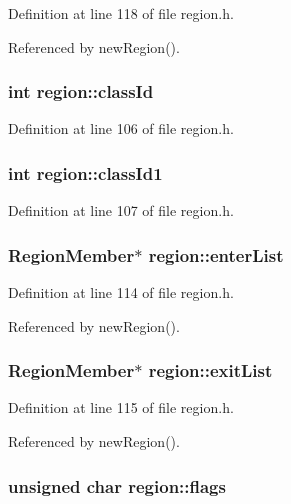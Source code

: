 Definition at line 118 of file region.h.

Referenced by new\-Region().
\subsubsection{\setlength{\rightskip}{0pt plus 5cm}int \bf{region::class\-Id}}\label{structregion_3cc7d5453a5b9b391f7f7270f28cb848}




Definition at line 106 of file region.h.
\subsubsection{\setlength{\rightskip}{0pt plus 5cm}int \bf{region::class\-Id1}}\label{structregion_12dd23f48c7d164bd5e8dcb6c7e80d1c}




Definition at line 107 of file region.h.
\subsubsection{\setlength{\rightskip}{0pt plus 5cm}\bf{Region\-Member}$\ast$ \bf{region::enter\-List}}\label{structregion_9dad214bc7a5636b0327b2a30c7c08d8}




Definition at line 114 of file region.h.

Referenced by new\-Region().
\subsubsection{\setlength{\rightskip}{0pt plus 5cm}\bf{Region\-Member}$\ast$ \bf{region::exit\-List}}\label{structregion_6835b97b03567e99751d07372f94ad3a}




Definition at line 115 of file region.h.

Referenced by new\-Region().
\subsubsection{\setlength{\rightskip}{0pt plus 5cm}unsigned char \bf{region::flags}}\label{structregion_a3e208bb4c36a96ab1795ace6bec4ecf}




